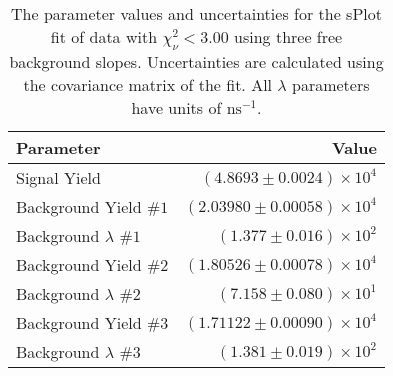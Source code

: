 
\begin{table}[ht]
    \begin{center}
        \begin{tabular}{lr}\toprule
            Parameter & Value \\\midrule
            Signal Yield & $(4.8693 \pm 0.0024) \times 10^{4}$ \\
            Background Yield $\#1$ & $(2.03980 \pm 0.00058) \times 10^{4}$ \\
            Background $\lambda$ $\#1$ & $(1.377 \pm 0.016) \times 10^{2}$ \\
            Background Yield $\#2$ & $(1.80526 \pm 0.00078) \times 10^{4}$ \\
            Background $\lambda$ $\#2$ & $(7.158 \pm 0.080) \times 10^{1}$ \\
            Background Yield $\#3$ & $(1.71122 \pm 0.00090) \times 10^{4}$ \\
            Background $\lambda$ $\#3$ & $(1.381 \pm 0.019) \times 10^{2}$ \\\bottomrule
        \end{tabular}
        \caption{The parameter values and uncertainties for the sPlot fit of data with $\chi^2_\nu < 3.00$ using three free background slopes. Uncertainties are calculated using the covariance matrix of the fit. All $\lambda$ parameters have units of $\si{\nano\second}^{-1}$.}\label{tab:splot-fit-results-chisqdof-3.00-free-3}
    \end{center}
\end{table}
